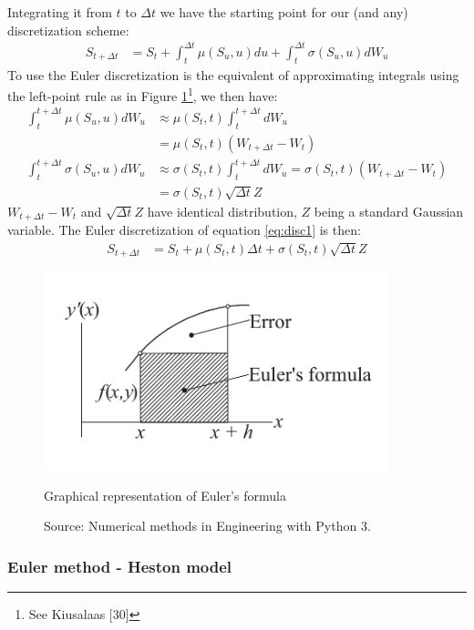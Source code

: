 \documentclass[12pt,oneside]{reedthesis}
\theoremstyle{definition}
\theoremstyle{definition}
\theoremstyle{remark}
\begin{document}
  Integrating it from \(t\) to \(\Delta t\) we have the starting point for
  our (and any) discretization scheme:
  \begin{align}
  \label{eq:disc1}
  S_{t+\Delta t} &= S_t + \int_{t}^{\Delta t}{\mu(S_u,u)}du + \int_{t}^{\Delta t}{\sigma(S_u,u)} dW_u
  \end{align}
  To use the Euler discretization is the equivalent of approximating
  integrals using the left-point rule as in Figure
  \ref{graph_euler}\footnote{See Kiusalaas {[}30{]}}, we then have:
  \begin{align*}
   \int_{t}^{t+\Delta t}{\mu(S_u,u)} dW_u &\approx \mu(S_t,t) \int_{t}^{t+\Delta t}dW_u\\
  &= \mu(S_t,t) (W_{t+\Delta t} - W_t)  \\
   \int_{t}^{t+\Delta t}{\sigma(S_u,u)} dW_u &\approx \sigma(S_t,t) \int_{t}^{t+\Delta t}dW_u 
  = \sigma(S_t,t) (W_{t+\Delta t} - W_t)  \\
  &= \sigma(S_t,t) \sqrt{\Delta t} Z
  \end{align*}
  \(W_{t+\Delta t}-W_t\) and \(\sqrt{\Delta t}Z\) have identical
  distribution, \(Z\) being a standard Gaussian variable. The Euler
  discretization of equation \eqref{eq:disc1} is then:
  \begin{align}
  \label{eq:disc2}
  S_{t+\Delta t} &= S_t + \mu(S_t,t)\Delta t + \sigma(S_t,t)\sqrt{\Delta t}Z
  \end{align}
  \begin{figure}
  \begin{center}
      \includegraphics[width=100mm]{figure/euler_screen.png}
      \caption{Graphical representation of Euler’s formula}\label{graph_euler}
      \caption*{\scriptsize{Source: Numerical methods in Engineering with Python 3.}}
  \end{center}
  \end{figure}
  \subsubsection{Euler method - Heston
  model}\label{euler-method---heston-model}
  
\end{document}
